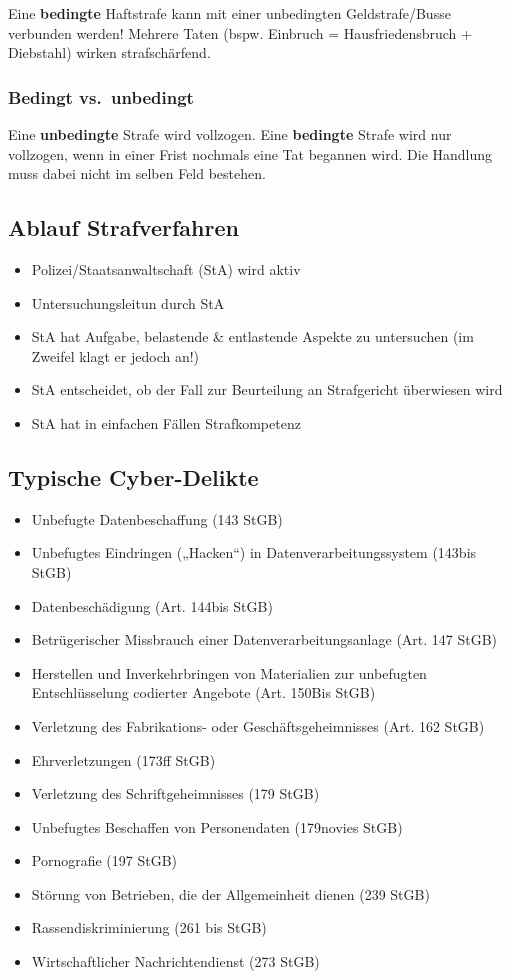 Eine \textbf{bedingte} Haftstrafe kann mit einer unbedingten Geldstrafe/Busse
verbunden werden! Mehrere Taten (bspw. Einbruch = Hausfriedensbruch + Diebstahl)
wirken strafschärfend.

\subsubsection{Bedingt vs.~unbedingt}

Eine \textbf{unbedingte} Strafe wird vollzogen. Eine \textbf{bedingte}
Strafe wird nur vollzogen, wenn in einer Frist nochmals eine Tat
begannen wird. Die Handlung muss dabei nicht im selben Feld bestehen.

\subsection{Ablauf Strafverfahren}

\begin{itemize}
	\tightlist
	\item Polizei/Staatsanwaltschaft (StA) wird aktiv
	\item Untersuchungsleitun durch StA
	\item StA hat Aufgabe, belastende \& entlastende Aspekte zu untersuchen (im
	Zweifel klagt er jedoch an!)
	\item StA entscheidet, ob der Fall zur Beurteilung an Strafgericht
	überwiesen wird
	\item StA hat in einfachen Fällen Strafkompetenz
\end{itemize}

\subsection{Typische Cyber-Delikte}
\label{sec:CD-Overview}

\begin{itemize}
	\tightlist
	\item Unbefugte Datenbeschaffung (143 StGB)
	\item Unbefugtes Eindringen („Hacken``) in Datenverarbeitungssystem (143bis
	StGB)
	\item Datenbeschädigung (Art. 144bis StGB)
	\item Betrügerischer Missbrauch einer Datenverarbeitungsanlage (Art. 147
	StGB)
	\item Herstellen und Inverkehrbringen von Materialien zur unbefugten
	Entschlüsselung codierter Angebote (Art. 150Bis StGB)
	\item Verletzung des Fabrikations- oder Geschäftsgeheimnisses (Art. 162
	StGB)
	\item Ehrverletzungen (173ff StGB)
	\item Verletzung des Schriftgeheimnisses (179 StGB)
	\item Unbefugtes Beschaffen von Personendaten (179novies StGB)
	\item Pornografie (197 StGB)
	\item Störung von Betrieben, die der Allgemeinheit dienen (239 StGB)
	\item Rassendiskriminierung (261 bis StGB)
	\item Wirtschaftlicher Nachrichtendienst (273 StGB)
\end{itemize}

